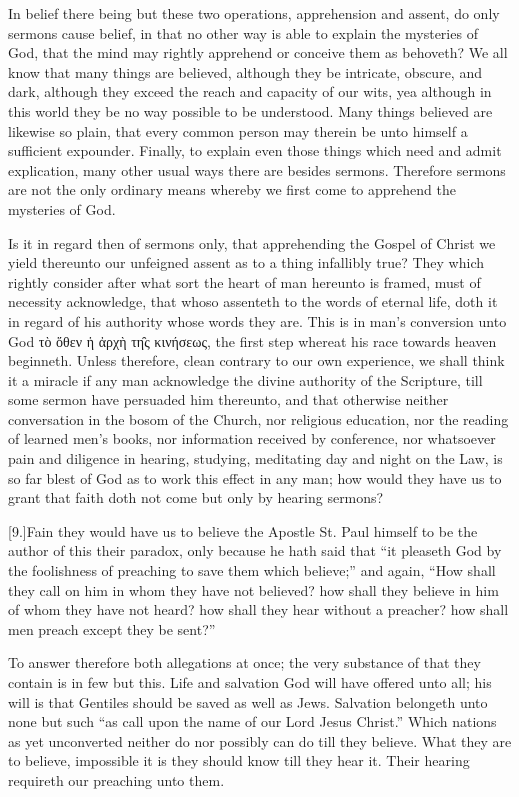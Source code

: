 In belief there being but these two operations, apprehension  and assent, do only sermons cause belief, in that no other way is able to explain the mysteries of God, that the mind may rightly apprehend or conceive them as behoveth?
 We all know that many things are believed, although they be intricate, obscure, and dark, although they exceed the reach and capacity of our wits, yea although in this world they be no way possible to be understood. Many things believed are likewise so plain, that every common person may therein be unto himself a sufficient expounder. Finally, to explain even those things which need and admit explication, many other usual ways there are besides sermons. Therefore sermons are not the only ordinary means whereby we first come to apprehend the mysteries of God.

Is it in regard then of sermons only, that apprehending the Gospel of Christ we yield thereunto our unfeigned assent as to a thing infallibly true? They which rightly consider after what sort the heart of man hereunto is framed, must of necessity acknowledge, that whoso assenteth to the words of eternal life, doth it in regard of his authority whose words they are. This is in man’s conversion unto God τὸ ὅθεν ἡ ἀρχὴ τη̑ς κινήσεως, the first step whereat his race towards heaven beginneth. Unless therefore, clean contrary to our own experience, we shall think it a miracle if any man acknowledge the divine authority of the Scripture, till some sermon have persuaded him thereunto, and that otherwise neither conversation in the bosom of the Church, nor religious education, nor the reading of learned men’s books, nor information received by conference, nor whatsoever pain and diligence in hearing, studying, meditating day and night on the Law, is so far blest of God as to work this effect in any man; how would they have us to grant that faith doth not come but only by hearing sermons?

[9.]Fain they would have us to believe the Apostle St. Paul himself to be the author of this their paradox, only because he hath said that “it pleaseth God by the foolishness of preaching to save them which believe;” and again, “How shall they call on him in whom they have not believed? how shall they believe in him of whom they have not heard? how shall they hear without a preacher? how shall men preach except they be sent?”



To answer therefore both allegations at once; the very substance of that they contain is in few but this. Life and salvation God will have offered unto all; his will is that Gentiles should be saved as well as Jews. Salvation belongeth unto none but such “as call upon the name of our Lord Jesus Christ.” Which nations as yet unconverted neither do nor possibly can do till they believe. What they are to believe, impossible it is they should know till they hear it. Their hearing requireth our preaching unto them.

